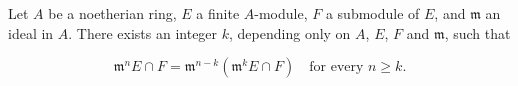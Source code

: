Let $A$ be a noetherian ring, $E$ a finite $A$-module, $F$ a submodule of $E$, and $\mathfrak{m}$ an ideal in $A$. There exists an integer $k$, depending only on $A$, $E$, $F$ and $\mathfrak{m}$, such that

$$\mathfrak{m}^n E \cap F = \mathfrak{m}^{n-k}(\mathfrak{m}^k E \cap F) \quad \text{for every } n \geq k.$$